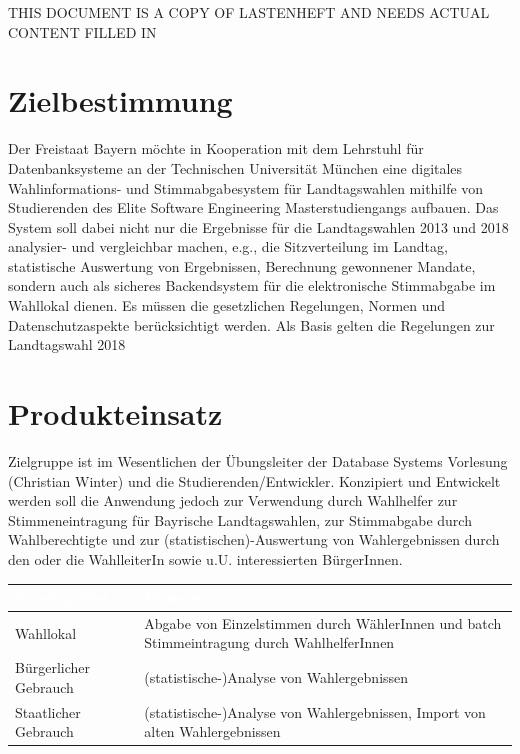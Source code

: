 \documentclass[a4paper,12pt]{article}
\begin{document}
 \setcounter{page}{2}
 
 THIS DOCUMENT IS A COPY OF LASTENHEFT AND NEEDS ACTUAL CONTENT FILLED IN
 \clearpage

 \tableofcontents          %
 \clearpage
 
\section{Zielbestimmung}
Der Freistaat Bayern möchte in Kooperation mit dem Lehrstuhl für 
Datenbanksysteme an der Technischen Universität München eine digitales 
Wahlinformations- und Stimmabgabesystem für Landtagswahlen mithilfe von 
Studierenden des Elite Software Engineering Masterstudiengangs aufbauen.
%
Das System soll dabei nicht nur die Ergebnisse für die Landtagswahlen 
2013 und 2018 analysier- und vergleichbar machen, e.g., die Sitzverteilung 
im Landtag, statistische Auswertung von Ergebnissen, Berechnung gewonnener
Mandate, sondern auch als sicheres Backendsystem für die elektronische 
Stimmabgabe im Wahllokal dienen. 
%
Es müssen die gesetzlichen Regelungen, Normen und Datenschutzaspekte
berücksichtigt werden. Als Basis gelten die Regelungen zur
Landtagswahl 2018

\section{Produkteinsatz}
Zielgruppe ist im Wesentlichen der Übungsleiter der Database Systems 
Vorlesung (Christian Winter) und die Studierenden/Entwickler. 
%
Konzipiert und Entwickelt werden soll die Anwendung jedoch zur Verwendung 
durch Wahlhelfer zur Stimmeneintragung für Bayrische Landtagswahlen, 
zur Stimmabgabe durch Wahlberechtigte und zur (statistischen)-Auswertung
von Wahlergebnissen durch den oder die WahlleiterIn sowie u.U. 
interessierten BürgerInnen.

\begin{center}
\begin{tabular}{|m{5cm}|m{10cm}|}
	\hline
  \rowcolor{Blue} \textcolor{white}{\textbf{Einsatzgebiet}} & \textcolor{white}{\textbf{Prozesse}} \\
  \hline
  Wahllokal & Abgabe von Einzelstimmen durch WählerInnen und batch Stimmeintragung durch WahlhelferInnen \\
	\hline
  Bürgerlicher Gebrauch & (statistische-)Analyse von Wahlergebnissen \\
  \hline
  Staatlicher Gebrauch & (statistische-)Analyse von Wahlergebnissen, Import von alten Wahlergebnissen \\
	\hline
\end{tabular}
\end{center}
\end{document}
